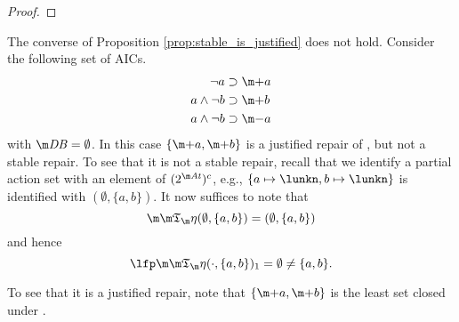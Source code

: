 \begin{proof}
% 
% 
% 
% 
% 
% 
% 
%  
%  
%  
% 
% 
% 
% 
%  
%  
%  
%  
\end{proof}

\begin{example}\label{ex:justified_not_stable}
 The converse of Proposition \ref{prop:stable_is_justified} does not hold. Consider the following set \aics of AICs. 
 \begin{align*}
  \lnot a &\aicrule \add a \\
  a\land \lnot b &\aicrule \add b\\
  a \land \lnot b &\aicrule \remove a
 \end{align*}
 with $\db=\emptyset$. 
 In this case $\{\add a,\add b\}$ is a justified repair of \fulldb, but not a stable repair. 
 To see that it is not a stable repair, recall that we identify a partial action set with an element of $(2^{\atoms})^c$, e.g., $\{a\mapsto\lunkn,b\mapsto\lunkn\}$ is identified with $(\emptyset,\{a,b\})$. It now suffices to note that 
 \[
 \Ap(\emptyset,\{a,b\}) = (\emptyset,\{a,b\})
 \]
 and hence
 \[
 \lfp \Ap(\cdot,\{a,b\})_1 = \emptyset\neq \{a,b\}.\]
  
To see that it is a justified repair, note that $\{\add a,\add b\}$ is the least set closed under \aics. 
\end{example}

